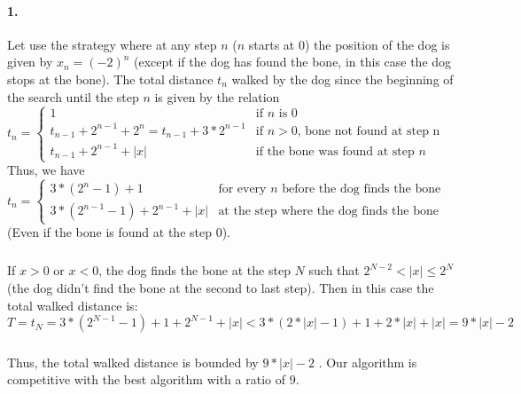 \paragraph{1.}
Let use the strategy where at any step $n$ ($n$ starts at $0$) the position of the dog is given by $x_n = (-2)^n$ (except if the dog has found the bone, in this case the dog stops at the bone).
\newline
\newline
The total distance $t_n$ walked  by the dog since the beginning of the search until the step $n$ is given by the relation
\newline
$t_n = \begin{cases}
1 & \mbox{if } n \mbox{ is 0}
\\ t_{n-1}+2^{n-1}+2^{n}=t_{n-1}+3*2^{n-1} & \mbox{if } n>0 \mbox{, bone not found at step n}
\\ t_{n-1}+2^{n-1}+|x| & \mbox{if the bone was found at step } n
\end{cases}$
\newline
\newline
Thus, we have
\newline
$t_n=\begin{cases}
3*(2^n-1)+1 & \mbox{for every } n \mbox{ before the dog finds the bone}
\\ 3*(2^{n-1}-1) + 2^{n-1} + |x| & \mbox{at the step where the dog finds the bone}
\end{cases}$
\newline
(Even if the bone is found at the step $0$).
\subparagraph{}
If $x > 0$ or $x < 0$, the dog finds the bone at the step $N$ such that $2^{N-2}<|x|\leq 2^N$ (the dog didn't find the bone at the second to last step).
\newline
Then in this case the total walked distance is:
\newline
$T=t_N=3*(2^{N-1}-1)+1+2^{N-1}+|x|<3*(2*|x|-1) +1 + 2*|x|+|x|=9*|x|-2$
\subparagraph{}
Thus, the total walked distance is bounded by $9*|x|-2$ . Our algorithm is competitive with the best algorithm with a ratio of $9$.

